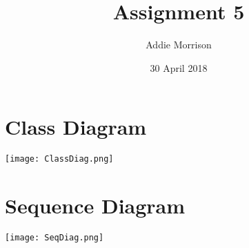 \documentclass{article}
\title{Assignment 5}
\author{Addie Morrison}
\date{30 April 2018}
\begin{document}
\maketitle
\section*{Class Diagram}
\texttt{[image: ClassDiag.png]}
\section*{Sequence Diagram}
\texttt{[image: SeqDiag.png]}
\end{document}
